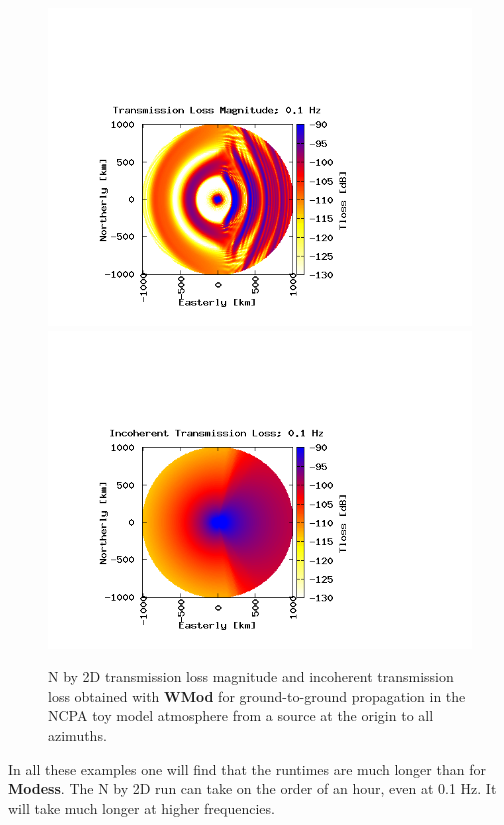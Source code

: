 \begin{figure}
\begin{center}
\includegraphics[scale=0.45,trim = 70 20 180 140,clip]{figs/cmodess_ex3}
\includegraphics[scale=0.45,trim = 70 20 180 140,clip]{figs/cmodess_ex3_inco}
\end{center}
\caption{N by 2D transmission loss magnitude and incoherent transmission loss obtained with {\bf WMod} for ground-to-ground propagation in the NCPA toy model atmosphere from a source at the origin to all azimuths.}
\label{fig: cmodess Nby2D tl}
\end{figure}

In all these examples one will find that the runtimes are much longer than for \textbf{Modess}. The N by 2D run can take on the order of an hour, even at 0.1 Hz. It will take much longer at higher frequencies. 